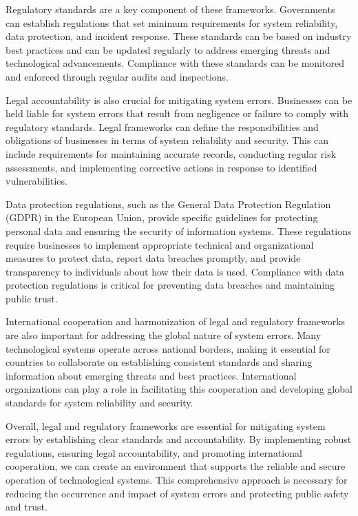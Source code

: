 \documentclass[10pt, conference, letterpaper]{IEEEtran}
\begin{document}
Regulatory standards are a key component of these frameworks. Governments can establish regulations that set minimum requirements for system reliability, data protection, and incident response. These standards can be based on industry best practices and can be updated regularly to address emerging threats and technological advancements. Compliance with these standards can be monitored and enforced through regular audits and inspections.

Legal accountability is also crucial for mitigating system errors. Businesses can be held liable for system errors that result from negligence or failure to comply with regulatory standards. Legal frameworks can define the responsibilities and obligations of businesses in terms of system reliability and security. This can include requirements for maintaining accurate records, conducting regular risk assessments, and implementing corrective actions in response to identified vulnerabilities.

Data protection regulations, such as the General Data Protection Regulation (GDPR) in the European Union, provide specific guidelines for protecting personal data and ensuring the security of information systems. These regulations require businesses to implement appropriate technical and organizational measures to protect data, report data breaches promptly, and provide transparency to individuals about how their data is used. Compliance with data protection regulations is critical for preventing data breaches and maintaining public trust.

International cooperation and harmonization of legal and regulatory frameworks are also important for addressing the global nature of system errors. Many technological systems operate across national borders, making it essential for countries to collaborate on establishing consistent standards and sharing information about emerging threats and best practices. International organizations can play a role in facilitating this cooperation and developing global standards for system reliability and security.

Overall, legal and regulatory frameworks are essential for mitigating system errors by establishing clear standards and accountability. By implementing robust regulations, ensuring legal accountability, and promoting international cooperation, we can create an environment that supports the reliable and secure operation of technological systems. This comprehensive approach is necessary for reducing the occurrence and impact of system errors and protecting public safety and trust.
\end{document}
